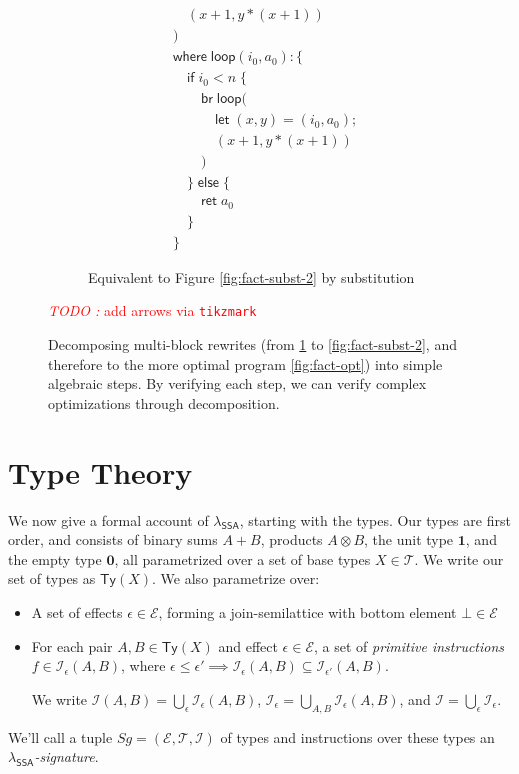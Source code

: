 \documentclass[acmsmall,screen,review]{acmart}
\newcounter{todos}
\newcommand{\TODO}[1]{{
  \stepcounter{todos}
  \begin{center}\large{\textcolor{red}{\emph{TODO \arabic{todos}:} #1}}\end{center}
}}
\newcommand{\mc}[1]{\ensuremath{\mathcal{#1}}}
\newcommand{\mb}[1]{\ensuremath{\mathbf{#1}}}
\newcommand{\ms}[1]{\ensuremath{\mathsf{#1}}}
\newcommand{\isotopessa}{\(\lambda_{\ms{SSA}}\)}
\begin{document}
\begin{figure}
\begin{subfigure}[c]{.5\textwidth}
\begin{align*}
      & \quad(x + 1, y * (x + 1)) \\
      & ) \\
      & \ms{where}\;\ms{loop}(i_0, a_0): \{\\
      & \quad \ms{if}\;i_0 < n\;\{ \\
      & \qquad \ms{br}\;\ms{loop}( \\
      & \qquad \quad \ms{let}\;(x, y) = (i_0, a_0); \\
      & \qquad \quad (x + 1, y * (x + 1)) \\ 
      & \qquad ) \\
      & \quad \}\;\ms{else}\;\{ \\
      & \qquad \ms{ret}\;a_0 \\
      & \quad \} \\
      & \}
    \end{align*}
    \caption{Equivalent to Figure \ref{fig:fact-subst-2} by substitution}
    \label{fig:fact-zero}
  \end{subfigure}
  \TODO{add arrows via \texttt{tikzmark}}
  \caption{
    Decomposing multi-block rewrites (from \ref{fig:fact-zero} to
    \ref{fig:fact-subst-2}, and therefore to the more optimal program 
    \ref{fig:fact-opt}) into simple algebraic steps. By verifying each step, we can
    verify complex optimizations through decomposition.
  } 
  \Description{}
  \label{fig:fact-dinat-rewrites}
\end{figure}

\section{Type Theory}

\label{sec:typing}

We now give a formal account of \isotopessa{}, starting with the types. Our types are first order, and
consists of binary sums $A + B$, products $A \otimes B$, the unit type $\mathbf{1}$, and the empty
type $\mb{0}$, all parametrized over a set of base types $X \in \mc{T}$. We write our set of types
as $\ms{Ty}(X)$. We also parametrize over:
\begin{itemize}
  
  \item A set of effects $\epsilon \in \mc{E}$, forming a join-semilattice with bottom element $\bot
  \in \mc{E}$
  
  \item For each pair $A, B \in \ms{Ty}(X)$ and effect $\epsilon \in \mc{E}$, a
  set of \textit{primitive instructions} $f \in \mc{I}_\epsilon(A, B)$, where
  $\epsilon \leq \epsilon' \implies \mc{I}_\epsilon(A, B) \subseteq
  \mc{I}_{\epsilon'}(A, B)$. 
  
  We write $\mc{I}(A, B) = \bigcup_\epsilon\mc{I}_\epsilon(A, B)$,
  $\mc{I}_\epsilon = \bigcup_{A, B}\mc{I}_\epsilon(A, B)$, and $\mc{I} =
  \bigcup_\epsilon\mc{I}_\epsilon$.

\end{itemize}
We'll call a tuple $Sg = (\mc{E}, \mc{T}, \mc{I})$ of types and instructions
over these types an \emph{\isotopessa{}-signature}.
\end{document}
